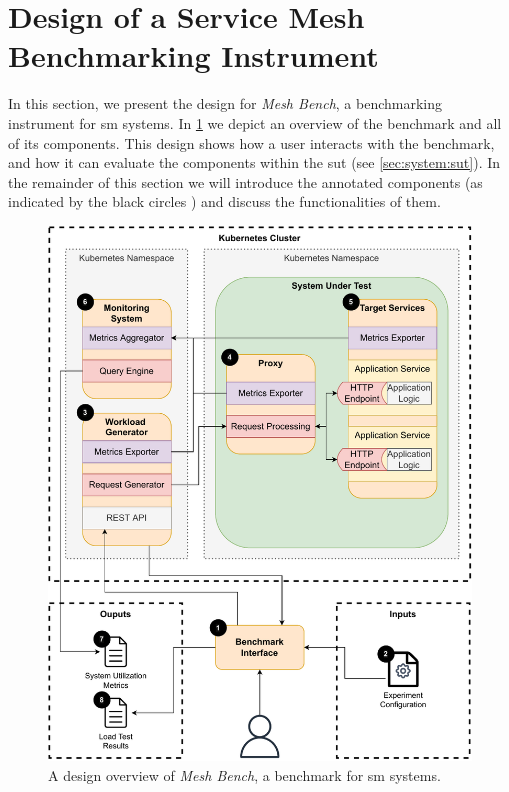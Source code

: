 \section{Design of a Service Mesh Benchmarking Instrument}
\label{sec:system:design}

In this section, we present the design for \textit{Mesh Bench}, a benchmarking instrument for \gls{sm} systems. In \cref{fig:benchmark-design} we depict an overview of the benchmark and all of its components. This design shows how a user interacts with the benchmark, and how it can evaluate the components within the \gls{sut} (see \cref{sec:system:sut}). In the remainder of this section we will introduce the annotated components (as indicated by the black circles ) and discuss the functionalities of them.

\begin{figure}[!t]
    \centering
     
    \includegraphics[width=0.9\linewidth]{4_system_design/figures/detailed-benchmark-design.pdf}
    
    \caption[Design of \textit{Mesh Bench}.]{A design overview of \textit{Mesh Bench}, a benchmark for \gls{sm} systems.}
    
    \label{fig:benchmark-design}
\end{figure}



